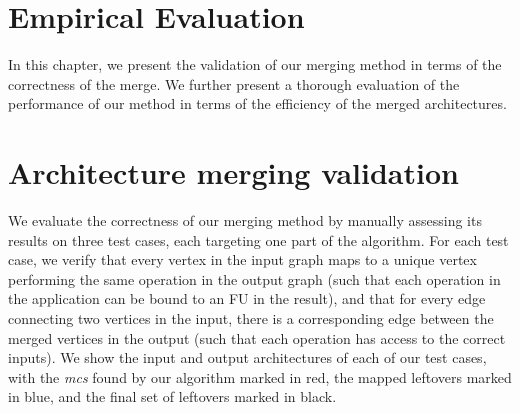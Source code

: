 \section{Empirical Evaluation}

\label{ch:results}
In this chapter, we present the validation of our merging method in terms of the correctness of the merge. We further present a thorough evaluation of the performance of our method in terms of the efficiency of the merged architectures.

\section{Architecture merging validation}
We evaluate the correctness of our merging method by manually assessing its results on three test cases, each targeting one part of the algorithm. For each test case, we verify that every vertex in the input graph maps to a unique vertex performing the same operation in the output graph (such that each operation in the application can be bound to an FU in the result), and that for every edge connecting two vertices in the input, there is a corresponding edge between the merged vertices in the output (such that each operation has access to the correct inputs). We show the input and output architectures of each of our test cases, with the \textit{mcs} found by our algorithm marked in red, the mapped leftovers marked in blue, and the final set of leftovers marked in black.

